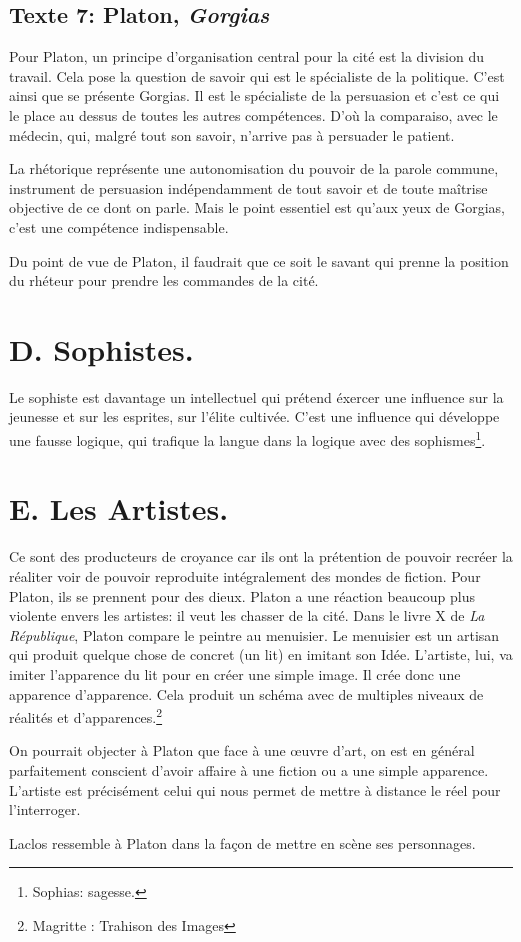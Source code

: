\documentclass[12pt]{article}
\begin{document}
\subsection*{Texte 7: Platon, \emph{Gorgias}}
Pour Platon, un principe d'organisation central pour la cité est la division du travail.
Cela pose la question de savoir qui est le spécialiste de la politique. 
C'est ainsi que se présente Gorgias.
Il est le spécialiste de la persuasion et c'est ce qui le place au dessus de toutes les autres compétences.
D'où la comparaiso, avec le médecin, qui, malgré tout son savoir, n'arrive pas à persuader le patient.\par
La rhétorique représente une autonomisation du pouvoir de la parole commune, instrument de persuasion indépendamment de tout savoir et de toute maîtrise objective de ce dont on parle.
Mais le point essentiel est qu'aux yeux de Gorgias, c'est une compétence indispensable.\par
Du point de vue de Platon, il faudrait que ce soit le savant qui prenne la position du rhéteur pour prendre les commandes de la cité.

\section*{\color{red}D. Sophistes.}
Le sophiste est davantage un intellectuel qui prétend éxercer une influence sur la jeunesse et sur les esprites, sur l'élite cultivée.
C'est une influence qui développe une fausse logique, qui trafique la langue dans la logique avec des sophismes\footnote{Sophias: sagesse.}.

\section*{\color{red}E. Les Artistes.}
Ce sont des producteurs de croyance car ils ont la prétention de pouvoir recréer la réaliter voir de pouvoir reproduite intégralement des mondes de fiction.
Pour Platon, ils se prennent pour des dieux.
Platon a une réaction beaucoup plus violente envers les artistes: il veut les chasser de la cité.
Dans le livre X de \emph{La République}, Platon compare le peintre au menuisier.
Le menuisier est un artisan qui produit quelque chose de concret (un lit) en imitant son Idée. 
L'artiste, lui, va imiter l'apparence du lit pour en créer une simple image.
Il crée donc une apparence d'apparence.
Cela produit un schéma avec de multiples niveaux de réalités et d'apparences.\footnote{Magritte : Trahison des Images}\par
On pourrait objecter à Platon que face à une \oe{uvre} d'art, on est en général parfaitement conscient d'avoir affaire à une fiction ou a une simple apparence.
L'artiste est précisément celui qui nous permet de mettre à distance le réel pour l'interroger.\par
Laclos ressemble à Platon dans la façon de mettre en scène ses personnages.
\end{document}
